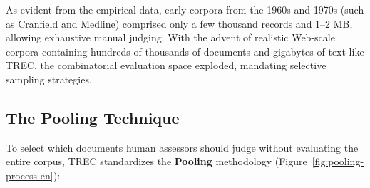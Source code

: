 \begin{table}[htbp]
\centering
{}
\caption{Comparative overview of classical historical evaluation test corpora.}
\label{tab:test-corpora-en}
\end{table}

As evident from the empirical data, early corpora from the 1960s and 1970s (such as Cranfield and Medline) comprised only a few thousand records and 1--2 MB, allowing exhaustive manual judging. With the advent of realistic Web-scale corpora containing hundreds of thousands of documents and gigabytes of text like TREC, the combinatorial evaluation space exploded, mandating selective sampling strategies.

\subsection{The Pooling Technique}
To select which documents human assessors should judge without evaluating the entire corpus, TREC standardizes the \textbf{Pooling} methodology (Figure~\ref{fig:pooling-process-en}):

